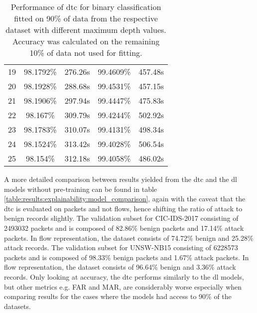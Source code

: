 \begin{table}[!h]
\begin{tabular}{c|cc|cc}
		19         & 98.1792\%     & 276.26s          & 99.4609\%    & 457.48s        \\
		20         & 98.1928\%     & 288.68s          & 99.4531\%    & 457.15s        \\
		21         & 98.1906\%     & 297.94s          & 99.4447\%    & 475.83s        \\
		22         & 98.167\%      & 309.79s          & 99.4244\%    & 502.92s        \\
		23         & 98.1783\%     & 310.07s          & 99.4131\%    & 498.34s        \\
		24         & 98.1524\%     & 313.42s          & 99.4028\%    & 506.54s        \\
		25         & 98.154\%      & 312.18s          & 99.4058\%    & 486.02s       
	\end{tabular}
	\caption{Performance of \gls{dtc} for binary classification fitted on 90\% of data from the respective dataset with different maximum depth values. Accuracy was calculated on the remaining 10\% of data not used for fitting.}
	\label{fig:results:dtc:depth_analysis}
\end{table}

A more detailed comparison between results yielded from the \gls{dtc} and the \gls{dl} models without pre-training can be found in table \ref{table:results:explainability:model_comparison}, again with the caveat that the \gls{dtc} is evaluated on packets and not flows, hence shifting the ratio of attack to benign records slightly. The validation subset for CIC-IDS-2017 consisting of 2493032 packets and is composed of 82.86\% benign packets and 17.14\% attack packets. In flow representation, the dataset consists of
74.72\% benign and 25.28\% attack records. The validation subset for UNSW-NB15 consisting of 6228573 packets and is composed of 98.33\% benign packets and 1.67\% attack packets. In flow representation, the dataset consists of 
96.64\% benign and 3.36\% attack records. Only looking at accuracy, the \gls{dtc} performs similarly to the \gls{dl} models, but other metrics e.g. FAR and MAR, are considerably worse especially when comparing results for the cases where the models had access to 90\% of the datasets. 

